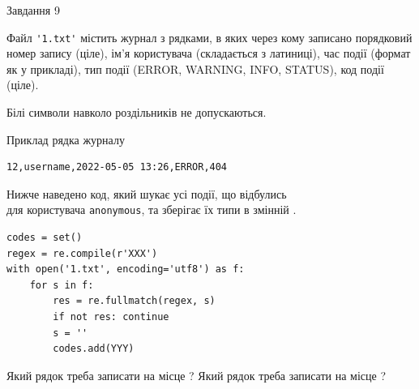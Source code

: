 \documentclass[12pt, ukrainian]{article}
\def\code#1{\Verb!#1!}
\begin{document}
{\begin{minipage}[t]{8.0cm}
\end{minipage}

               
{\begin{center}Завдання {9}\end{center}}
\vspace{-4mm}
Файл \code{'1.txt'} містить журнал з рядками, в яких через кому записано поряд\-ко\-вий номер запису (ціле), ім'я користувача (складається з латиниці), час події (фор\-мат як у прикладі), тип події (ERROR, WARNING, INFO, STATUS), код події (ціле).

Білі символи навколо роздільників не допускаються.

Приклад рядка журналу



\begin{verbatim}
12,username,2022-05-05 13:26,ERROR,404
\end{verbatim}


Нижче наведено код, який шукає усі події, що відбулись\\ для користувача \code{anonymous}, та зберігає їх типи в змінній .



\begin{verbatim}
codes = set()
regex = re.compile(r'XXX')
with open('1.txt', encoding='utf8') as f:
    for s in f:
        res = re.fullmatch(regex, s)
        if not res: continue
        s = ''
        codes.add(YYY)
\end{verbatim}



Який рядок треба записати на місце  ?
Який рядок треба записати на місце  ?\par

}
\end{document}
